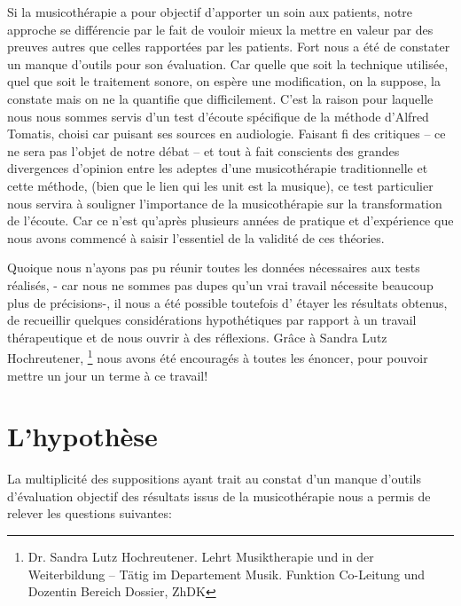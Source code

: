  



Si la musicothérapie a pour objectif d'apporter un soin aux patients, notre  approche se différencie par le fait de
vouloir mieux la mettre en valeur par des preuves
autres que celles rapportées par les patients. Fort nous a été de
constater un manque d'outils pour son évaluation. Car quelle que soit la technique utilisée, quel que soit
le traitement sonore, on espère une modification, on la suppose, la constate
 mais
 on ne la quantifie que difficilement. C'est la raison pour laquelle
 nous nous sommes servis d'un test d'écoute
 spécifique de la méthode d'Alfred Tomatis, choisi car puisant ses
 sources en audiologie. Faisant fi des critiques --
 ce ne sera pas l'objet de notre débat -- et  tout à fait conscients des
 grandes divergences d'opinion entre les adeptes d'une musicothérapie
 traditionnelle et cette méthode, (bien que le lien qui les unit est la musique), ce test particulier  nous servira à
 souligner l'importance de la musicothérapie 
 sur la transformation de l'écoute.
 Car ce n'est qu'après plusieurs
années de pratique et d'expérience que nous avons commencé à saisir
l'essentiel de la validité de ces théories.

Quoique nous n'ayons pas pu réunir toutes les données nécessaires
aux tests réalisés, - car nous ne sommes pas dupes qu'un vrai travail
nécessite beaucoup plus de précisions-, il nous a été possible toutefois d' étayer
les résultats obtenus, de recueillir quelques considérations hypothétiques par rapport à un
travail thérapeutique et de nous ouvrir à des réflexions. 
Grâce à Sandra Lutz Hochreutener,  \footnote{Dr. Sandra Lutz
  Hochreutener. Lehrt Musiktherapie und in der Weiterbildung – Tätig
  im Departement Musik. Funktion Co-Leitung und Dozentin Bereich
  Dossier, ZhDK}
 nous avons été encouragés à toutes les énoncer, pour pouvoir mettre un jour un terme à ce travail!


 

  


\section {L'hypothèse}


   La
   multiplicité des suppositions ayant trait au constat d'un manque
   d'outils d'évaluation objectif des résultats issus de la
   musicothérapie  nous a  permis de relever les questions
   suivantes:  



